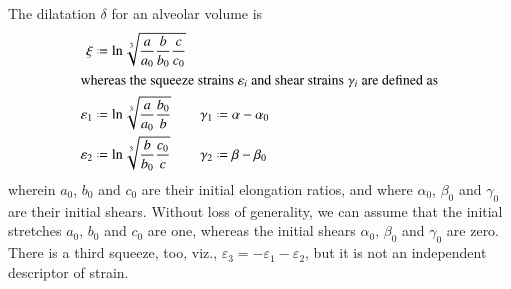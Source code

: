 The dilatation $\delta$ for an alveolar volume is
\begin{subequations}
    \begin{align}
    \mathrm  \xi & \defeq \ln \sqrt[3]{\frac{a}{a_0}
        \frac{b}{b_0} \frac{c}{c_0}} \\
    \intertext{whereas the squeeze strains $\varepsilon_i$ and shear strains $\gamma_i$ are defined as}
    \varepsilon_1 & \defeq \ln \sqrt[3]{\frac{a}
        {a_0} \frac{b_0}{b}} & 	\gamma_1 & \defeq \alpha - \alpha_0 \\
    \varepsilon_2 & \defeq \ln \sqrt[3]{\frac{b}
        {b_0} \frac{c_0}{c}} & \gamma_2 & \defeq \beta - \beta_0 
    \end{align}
\end{subequations}
wherein $a_0$, $b_0$ and $c_0$ are their initial elongation ratios, and where $\alpha_0$, $\beta_0$ and $\gamma_0$ are their initial shears. Without loss of generality, we can assume that the initial stretches $a_0$, $b_0$ and $c_0$ are one, whereas the initial shears $\alpha_0$, $\beta_0$ and $\gamma_0$ are zero. There is a third squeeze, too, viz., $\varepsilon_3 = -\varepsilon_1 - \varepsilon_2$, but it is not an independent descriptor of strain.


